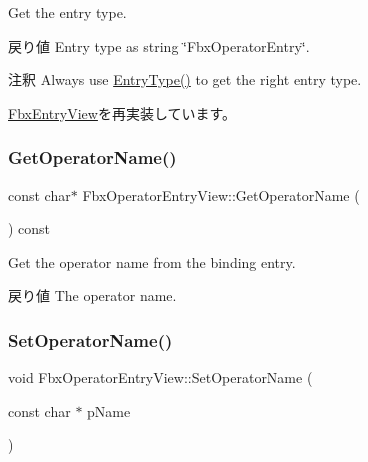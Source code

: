Get the entry type. \begin{DoxyReturn}{戻り値}
Entry type as string \char`\"{}\+Fbx\+Operator\+Entry\char`\"{}. 
\end{DoxyReturn}
\begin{DoxyRemark}{注釈}
Always use \hyperlink{class_fbx_operator_entry_view_a7821c1bf43a30e4c8ba054c66f051ad0}{Entry\+Type()} to get the right entry type. 
\end{DoxyRemark}


\hyperlink{class_fbx_entry_view_a83ee50482b441ba8b0e6d7c2dba5432f}{Fbx\+Entry\+View}を再実装しています。

\mbox{\label{class_fbx_operator_entry_view_a7ce91f3c0d933aa9bb0ad8b9c1f82c32}} 
\subsubsection{\texorpdfstring{Get\+Operator\+Name()}{GetOperatorName()}}
{\footnotesize\ttfamily const char$\ast$ Fbx\+Operator\+Entry\+View\+::\+Get\+Operator\+Name (\begin{DoxyParamCaption}{ }\end{DoxyParamCaption}) const}

Get the operator name from the binding entry. \begin{DoxyReturn}{戻り値}
The operator name. 
\end{DoxyReturn}
\mbox{\label{class_fbx_operator_entry_view_a00d1bca18f1450d07326d22e889c7520}} 
\subsubsection{\texorpdfstring{Set\+Operator\+Name()}{SetOperatorName()}}
{\footnotesize\ttfamily void Fbx\+Operator\+Entry\+View\+::\+Set\+Operator\+Name (\begin{DoxyParamCaption}\item[{const char $\ast$}]{p\+Name }\end{DoxyParamCaption})}

